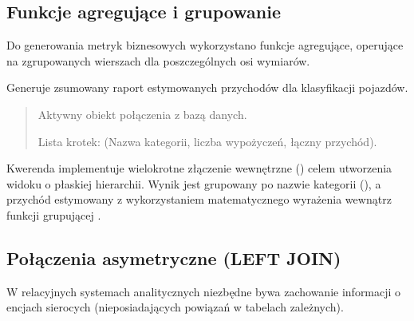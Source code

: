 \documentclass[a4paper,11pt,english,openany,oneside]{sphinxmanual}
\begin{document}
\subsection{Funkcje agregujące i grupowanie}
\label{\detokenize{rozdzial_5/index:funkcje-agregujace-i-grupowanie}}
\sphinxAtStartPar
Do generowania metryk biznesowych wykorzystano funkcje agregujące, operujące na zgrupowanych wierszach dla poszczególnych osi wymiarów.


\begin{savenotes}\begin{fulllineitems}

\pysigstartsignatures
\pysiglinewithargsret
{}
{}
{}
\pysigstopsignatures
\sphinxAtStartPar
Generuje zsumowany raport estymowanych przychodów dla klasyfikacji pojazdów.
\begin{quote}\begin{description}
\sphinxAtStartPar
{} \textendash{} Aktywny obiekt połączenia z bazą danych.

\sphinxAtStartPar
Lista krotek: (Nazwa kategorii, liczba wypożyczeń, łączny przychód).

\end{description}\end{quote}

\sphinxAtStartPar
{} Kwerenda implementuje wielokrotne złączenie wewnętrzne () celem utworzenia widoku o płaskiej hierarchii. Wynik jest grupowany po nazwie kategorii (), a przychód estymowany z wykorzystaniem matematycznego wyrażenia wewnątrz funkcji grupującej .

\end{fulllineitems}\end{savenotes}



\subsection{Połączenia asymetryczne (LEFT JOIN)}
\label{\detokenize{rozdzial_5/index:polaczenia-asymetryczne-left-join}}
\sphinxAtStartPar
W relacyjnych systemach analitycznych niezbędne bywa zachowanie informacji o encjach sierocych (nieposiadających powiązań w tabelach zależnych).
\end{document}
